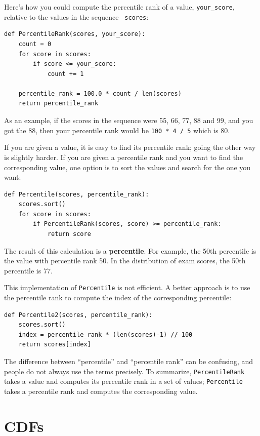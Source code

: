 \documentclass[12pt]{book}
\begin{document}
Here's how you could compute the percentile rank of a value,
\verb"your_score", relative to the values in the sequence {\tt
  scores}:
%
\begin{verbatim}
def PercentileRank(scores, your_score):
    count = 0
    for score in scores:
        if score <= your_score:
            count += 1

    percentile_rank = 100.0 * count / len(scores)
    return percentile_rank
\end{verbatim}

As an example, if the
scores in the sequence were 55, 66, 77, 88 and 99, and you got the 88,
then your percentile rank would be {\tt 100 * 4 / 5} which is 80.

If you are given a value, it is easy to find its percentile rank; going
the other way is slightly harder.  If you are given a percentile rank
and you want to find the corresponding value, one option is to
sort the values and search for the one you want:
%
\begin{verbatim}
def Percentile(scores, percentile_rank):
    scores.sort()
    for score in scores:
        if PercentileRank(scores, score) >= percentile_rank:
            return score
\end{verbatim}

The result of this calculation is a {\bf percentile}.  For example,
the 50th percentile is the value with percentile rank 50.  In the
distribution of exam scores, the 50th percentile is 77.

This implementation of {\tt Percentile} is not efficient.  A
better approach is to use the percentile rank to compute the index of
the corresponding percentile:

\begin{verbatim}
def Percentile2(scores, percentile_rank):
    scores.sort()
    index = percentile_rank * (len(scores)-1) // 100
    return scores[index]
\end{verbatim}

The difference between ``percentile'' and ``percentile rank'' can
be confusing, and people do not always use the terms precisely.
To summarize, {\tt PercentileRank} takes a value and computes
its percentile rank in a set of values; {\tt Percentile} takes
a percentile rank and computes the corresponding value.


\section{CDFs}
\end{document}
